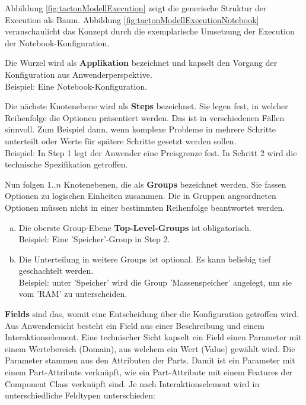 \documentclass[12pt,a4paper,bibliography=totocnumbered,listof=totoc]{scrartcl}
\begin{document}
Abbildung \ref{fig:tactonModellExecution} zeigt die generische Struktur der Execution als Baum. Abbildung \ref{fig:tactonModellExecutionNotebook} veranschaulicht das Konzept durch die exemplarische Umsetzung der Execution der Notebook-Konfiguration.
\begin{compactitem}
\item Die Wurzel wird als \textbf{Applikation} bezeichnet und kapselt den Vorgang der Konfiguration aus Anwenderperspektive.\\
Beispiel: Eine Notebook-Konfiguration.
\item Die nächste Knotenebene wird als \textbf{Steps} bezeichnet. Sie legen fest, in welcher Reihenfolge die Optionen präsentiert werden. Das ist in verschiedenen Fällen sinnvoll. Zum Beispiel dann, wenn komplexe Probleme in mehrere Schritte unterteilt oder Werte für spätere Schritte gesetzt werden sollen.\\
Beispiel: In Step 1 legt der Anwender eine Preisgrenze fest. In Schritt 2 wird die technische Spezifikation getroffen.
\item  Nun folgen $1..n$ Knotenebenen, die als \textbf{Groups} bezeichnet werden. Sie fassen Optionen zu logischen Einheiten zusammen. Die in Gruppen angeordneten Optionen müssen nicht in einer bestimmten Reihenfolge beantwortet werden.
\begin{enumerate}[(a)]
\item Die oberste Group-Ebene \textbf{Top-Level-Groups} ist obligatorisch.\\
Beispiel: Eine 'Speicher'-Group in Step 2.
\item Die Unterteilung in weitere Groups ist optional. Es kann beliebig tief geschachtelt werden.\\
Beispiel: unter 'Speicher' wird die Group 'Massenspeicher' angelegt, um sie vom 'RAM' zu unterscheiden.
\end{enumerate}
\item \textbf{Fields} sind das, womit eine Entscheidung über die Konfiguration getroffen wird. Aus Anwendersicht besteht ein Field aus einer Beschreibung und einem Interaktionselement. Eine technischer Sicht kapselt ein Field einen Parameter mit einem Wertebereich (Domain), aus welchem ein Wert (Value) gewählt wird. Die Parameter stammen aus den Attributen der Parts. Damit ist ein Parameter mit einem Part-Attribute verknüpft, wie ein Part-Attribute mit einem Features der Component Class verknüpft sind. Je nach Interaktionselement wird in unterschiedliche Feldtypen unterschieden:
\begin{enumerate}[(a)]

\end{enumerate}
\end{compactitem}
\end{document}

